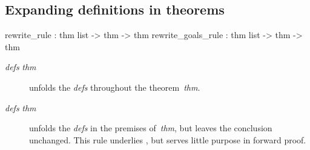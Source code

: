 \subsection{Expanding definitions in theorems}
\begin{ttbox} 
rewrite_rule       : thm list -> thm -> thm
rewrite_goals_rule : thm list -> thm -> thm
\end{ttbox}
\begin{description}
\item[ {\it defs} {\it thm}]  
unfolds the {\it defs} throughout the theorem~{\it thm}.

\item[ {\it defs} {\it thm}]  
unfolds the {\it defs} in the premises of~{\it thm}, but leaves the
conclusion unchanged.  This rule underlies , but 
serves little purpose in forward proof.
\end{description}


